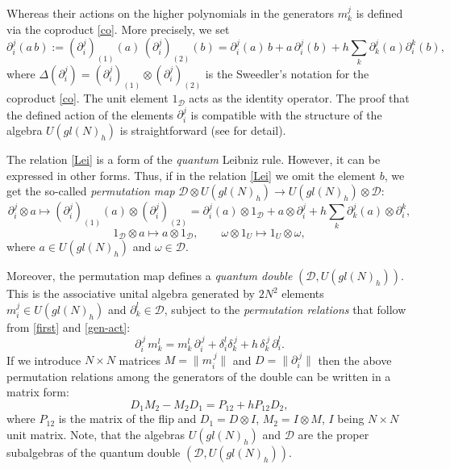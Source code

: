 \documentclass[10pt,a4paper]{amsart}
\newcommand{\pa}{\partial}
\newcommand{\De}{\Delta}
\newcommand{\ot}{\otimes}
\newcommand{\DD}{\mathcal{D}}
\numberwithin{equation}{section}
\begin{document}
Whereas their actions on the higher polynomials in the generators $m_k^j$ is defined via the coproduct \eqref{co}. More precisely, we set
\begin{equation}
\pa_i^j(a\,b):= (\pa_i^j)_{(1)}(a)\, (\pa_i^j)_{(2)}(b) = \partial_i^j(a)\,b+ a\,\partial_i^j(b) +h\sum_k\partial_k^j(a)
\partial_i^k(b),
\label{Lei}
\end{equation}
where $\De(\pa_i^j) = (\pa_i^j)_{(1)}\ot (\pa_i^j)_{(2)}$ is the Sweedler's notation for the coproduct \eqref{co}. The unit element
$1_\DD$ acts as the identity operator. The proof that the defined action of the elements $\pa_i^j$ is compatible with the structure of the algebra $U(gl(N)_h)$ is straightforward (see \cite{GPS2} for detail).

The relation \eqref{Lei} is a form of the {\em quantum} Leibniz rule. However, it can be expressed in other forms. Thus, if in the relation
\eqref{Lei} we omit the element $b$, we get the so-called {\em permutation map} $\DD\otimes U(gl(N)_h)\rightarrow U(gl(N)_h)\otimes \DD:$
\begin{equation}
\pa_i^j\ot a \longmapsto (\pa_i^j)_{(1)}(a)\ot (\pa_i^j)_{(2)} 
= \partial_i^j(a)\otimes 1_\DD+a\otimes \partial_i^j
+h\sum_k\partial_k^j(a)\otimes \partial_i^k, 
\label{first}
\end{equation}
$$
1_\DD\otimes a \longmapsto a\otimes 1_\DD, \qquad
\omega\otimes 1_U\longmapsto 1_U\otimes \omega,
$$
where $a\in U(gl(N)_h)$ and $\omega\in\DD$.


Moreover, the permutation map defines a \emph{quantum double} $(\DD,U(gl(N)_h))$. This is the associative unital algebra generated by
$2N^2$ elements $m_i^j\in U(gl(N)_h)$ and $\partial_k^l\in\DD$, subject to the \emph{permutation relations} that follow
from \eqref{first} and \eqref{gen-act}:
\begin{equation}
\pa_i^{\,j}\, m_k^l = m_k^l\,\partial_i^{\,j} +\delta_i^l\delta_k^{\,j}+ h\,\delta_k^{\,j}\,\partial_i^l.
\label{perrel}
\end{equation}
If we introduce $N\times N$ matrices $M = \|m_i^{\,j}\|$ and $D = \|\partial_i^{\,j}\|$ then the above permutation relations among the
generators of the double can be written in a matrix form:
\[
D_1M_2 - M_2D_1 = P_{12} +hP_{12}D_2,
\]
where $P_{12}$ is the matrix of the flip and $D_1 = D\otimes I$, $M_2 = I\otimes M$, $I$ being $N\times N$ unit matrix. Note, that
the algebras $U(gl(N)_h)$ and $\DD$ are the proper subalgebras of the quantum double $(\DD, U(gl(N)_h))$.
\end{document}
